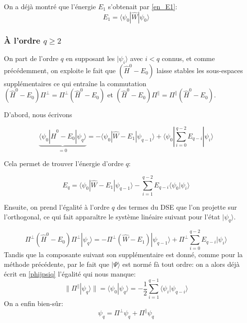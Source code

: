 \documentclass[svgnames,dvipsnames,a4paper,10pt,french]{report}
\begin{document}
On a déjà montré que l'énergie $E_1$ s'obtenait par \ref{en_E1}:
\begin{equation}
\label{en_o1}
    E_1 = \langle \psi_0 | \hat{W} | \psi_0 \rangle
\end{equation}



\subsubsection{À l'ordre $q\ge 2$}

On part de l'ordre $q$ en supposant les $|\psi_i\rangle$ avec $i<q$ connus, et comme précédemment, on exploite le fait que $(\hat{H}^0-E_0)$ laisse stables les sous-espaces supplémentaires ce qui entraîne la commutation $(\hat{H}^0-E_0) \Pi^\perp = \Pi^\perp (\hat{H}^0-E_0)$ et $(\hat{H}^0-E_0) \Pi^\parallel = \Pi^\parallel (\hat{H}^0-E_0)$.

D'abord, nous écrivons

\begin{equation}
\label{s_en1}
    \underbrace{\langle \psi_0 | \hat{H}^0-E_0 |\psi_q\rangle}_{=0} = -\langle \psi_0 | \hat{W}-E_1 |\psi_{q-1}\rangle + \langle \psi_0 |  \sum_{i=0}^{q-2} E_{q-i} |\psi_i\rangle
\end{equation}


Cela permet de trouver l'énergie d'ordre $q$:

\begin{equation}
\label{en_oq}
    E_q =    \langle \psi_0 |\hat{W}-E_1 | \psi_{q-1} \rangle - \sum_{i=1}^{q-2} E_{q-i} \langle \psi_0 |   \psi_{i}\rangle
\end{equation}

Ensuite,  on prend  l'égalité à l'ordre $q$ des termes du DSE  que l'on projette sur l'orthogonal, ce qui fait apparaître le système linéaire suivant pour l'état $|\psi_q \rangle$.

\begin{equation}
\label{s_perp}
    \Pi^\perp (\hat{H}^0-E_0)  \Pi^\perp |\psi_q\rangle = - \Pi^\perp (\hat{W}-E_1) |\psi_{q-1}\rangle +  \Pi^\perp \sum_{i=0}^{q-2} E_{q-i} |\psi_i\rangle
\end{equation}
Tandis que la composante suivant son supplémentaire est donné, comme pour la méthode précédente, par le fait que $|\Psi\rangle$ est normé fà tout ordre: on a alors déjà écrit en \ref{phijpsiq} l'égalité qui nous manque:
\begin{equation}
\label{s_para}
    \| \Pi^\parallel |\psi_q\rangle \| = \langle \psi_0 | \psi_q\rangle=-\frac{1}{2}\sum_{i=1}^{q-1} \langle \psi_i |\psi_{q-i} \rangle 
\end{equation}
On a enfin bien-sûr:
\begin{equation}
    \psi_q = \Pi^\perp \psi_q + \Pi^\parallel \psi_q
\end{equation}
\end{document}
